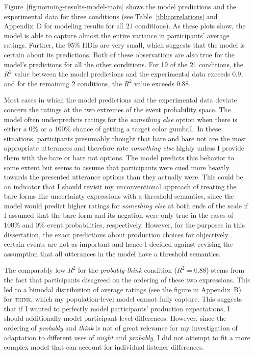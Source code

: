 Figure~\ref{fig:norming-results-model-main} shows the model predictions and the experimental data for three conditions 
(see Table~\ref{tbl:correlations} and Appendix~D for modeling results for all 21 conditions). As these plots show, the model
is able to capture almost the entire variance in participants' average ratings. Further, the 95\% HDIs are very small, which suggests
that the model is certain about its predictions. Both of these observations are also true for the model's predictions for all the other
conditions. For 19 of the 21 conditions, the $R^2$ value between the model predictions and the experimental data exceeds 0.9,
and for the remaining 2 conditions, the $R^2$ value exceeds 0.88. 

Most cases in which the model predictions and the experimental data deviate concern the ratings at the two extremes of the event probability space.
The model often underpredicts ratings for the \textit{something else} option when there is either a 0\% or a 100\% chance of 
getting a target color gumball. In these situations, participants presumably thought that {\sc bare} and {\sc bare not} are the most appropriate
utterances and therefore rate \textit{something else} highly unless I provide them with the {\sc bare} or {\sc bare not} options. The model predicts
this behavior to some extent but seems to assume that participants were cued more heavily towards the presented utterance options than they actually were.
This could be an indicator that I should revisit my unconventional approach of treating the bare forms like uncertainty expressions with a threshold semantics,
since the model would predict higher ratings for \textit{something else} at both ends of the scale if I assumed that the bare form and its negation were only true
in the cases of 100\% and 0\% event probabilities, respectively. 
However, for the purposes in this dissertation, the exact predictions about production choices for objectively certain events are not as important and hence
I decided against revising the assumption that all utterances in the model have a threshold semantics.

The comparably low $R^2$ for the \textit{probably-think} condition ($R^2=0.88$) stems
from the fact that participants disagreed on the ordering of these two expressions. This  
led to a bimodal distribution of average ratings (see the figure in Appendix~B) for \textsc{think}, which my population-level 
model cannot fully capture. This suggests that if I wanted to perfectly model participants' production expectations, I should
additionally model participant-level differences. However, since the ordering of \textit{probably} and \textit{think} is not of great relevance
for my investigation of adaptation to different uses of \textit{might} and \textit{probably}, I did not attempt to fit a more complex model
that can account for individual listener differences. 

